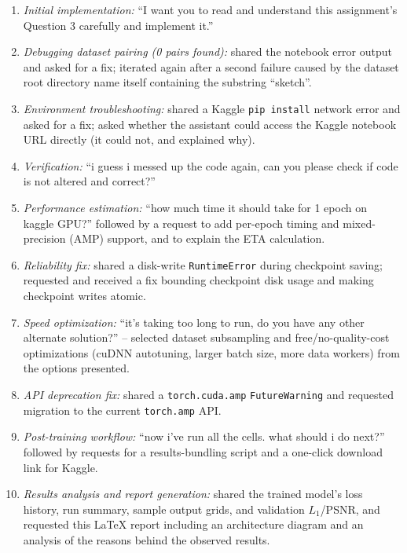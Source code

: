 \documentclass[conference]{IEEEtran}
\begin{document}
\begin{enumerate}
\item \textit{Initial implementation:} ``I want you to read and understand this
assignment's Question 3 carefully and implement it.''
\item \textit{Debugging dataset pairing (0 pairs found):} shared the notebook error
output and asked for a fix; iterated again after a second failure caused by the dataset
root directory name itself containing the substring ``sketch''.
\item \textit{Environment troubleshooting:} shared a Kaggle \texttt{pip install} network
error and asked for a fix; asked whether the assistant could access the Kaggle notebook
URL directly (it could not, and explained why).
\item \textit{Verification:} ``i guess i messed up the code again, can you please check
if code is not altered and correct?''
\item \textit{Performance estimation:} ``how much time it should take for 1 epoch on
kaggle GPU?'' followed by a request to add per-epoch timing and mixed-precision (AMP)
support, and to explain the ETA calculation.
\item \textit{Reliability fix:} shared a disk-write \texttt{RuntimeError} during
checkpoint saving; requested and received a fix bounding checkpoint disk usage and
making checkpoint writes atomic.
\item \textit{Speed optimization:} ``it's taking too long to run, do you have any other
alternate solution?'' -- selected dataset subsampling and free/no-quality-cost
optimizations (cuDNN autotuning, larger batch size, more data workers) from the options
presented.
\item \textit{API deprecation fix:} shared a \texttt{torch.cuda.amp} \texttt{FutureWarning}
and requested migration to the current \texttt{torch.amp} API.
\item \textit{Post-training workflow:} ``now i've run all the cells. what should i do
next?'' followed by requests for a results-bundling script and a one-click download link
for Kaggle.
\item \textit{Results analysis and report generation:} shared the trained model's loss
history, run summary, sample output grids, and validation $L_1$/PSNR, and requested this
LaTeX report including an architecture diagram and an analysis of the reasons behind the
observed results.
\end{enumerate}
\end{document}
